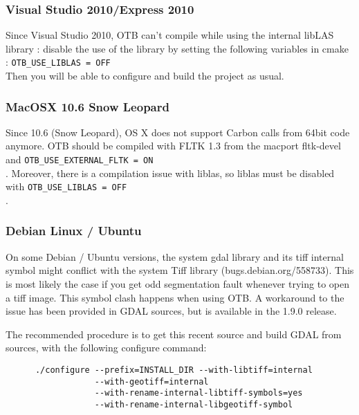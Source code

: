 
\subsubsection{Visual Studio 2010/Express 2010}
Since Visual Studio 2010, OTB can't compile while using the internal libLAS library : disable the use of the library by setting
the following variables in cmake :  \texttt{OTB\_USE\_LIBLAS = OFF}\\
Then you will be able to configure and build the project as usual.

\subsubsection{MacOSX 10.6 Snow Leopard}
Since 10.6 (Snow Leopard), OS X does not support Carbon calls from 64bit code anymore. OTB should be compiled with FLTK 1.3 from the macport fltk-devel and \texttt{OTB\_USE\_EXTERNAL\_FLTK = ON}\\. Moreover, there is a compilation issue with liblas, so liblas must be disabled with \texttt{OTB\_USE\_LIBLAS = OFF}\\.

%

\subsubsection{Debian Linux / Ubuntu}

On some Debian / Ubuntu versions, the system gdal library and its tiff internal symbol might conflict with the system Tiff library (bugs.debian.org/558733). This is most likely the case if you get odd segmentation fault whenever trying to open a tiff image. This symbol clash happens when using OTB. A workaround to the issue has been provided in GDAL sources, but is available in the 1.9.0 release.

The recommended procedure is to get this recent source and build GDAL from sources, with the following configure command:
  \begin{verbatim}
      ./configure --prefix=INSTALL_DIR --with-libtiff=internal
                  --with-geotiff=internal
                  --with-rename-internal-libtiff-symbols=yes
                  --with-rename-internal-libgeotiff-symbol
  \end{verbatim}


